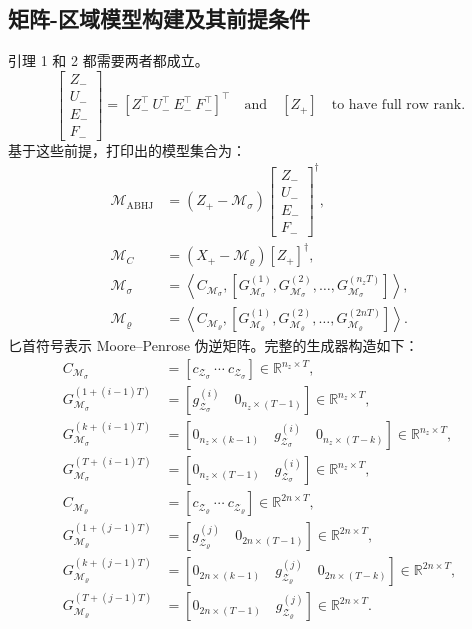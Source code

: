 \documentclass{article}
\begin{document}
\subsection*{矩阵-区域模型构建及其前提条件}
引理 1 和 2 都需要两者都成立。
\[
\begin{bmatrix}Z_-\\U_-\\E_-\\F_-\end{bmatrix}
=\left[Z_-^\top\ U_-^\top\ E_-^\top\ F_-^\top\right]^\top
\quad\text{and}\quad [Z_+]
\quad\text{to have full row rank}.
\]
基于这些前提，打印出的模型集合为：
\begin{align}
\mathcal{M}_{\mathrm{ABHJ}}&=(Z_+-\mathcal{M}_{\sigma})\begin{bmatrix}Z_-\\U_-\\E_-\\F_-\end{bmatrix}^{\dagger}, \tag{39}\\
\mathcal{M}_C&=(X_+-\mathcal{M}_{\varrho})[Z_+]^{\dagger}, \tag{40}\\
\mathcal{M}_{\sigma}&=\left\langle C_{\mathcal{M}_{\sigma}},[G_{\mathcal{M}_{\sigma}}^{(1)},G_{\mathcal{M}_{\sigma}}^{(2)},\ldots,G_{\mathcal{M}_{\sigma}}^{(n_zT)}]\right\rangle, \tag{41}\\
\mathcal{M}_{\varrho}&=\left\langle C_{\mathcal{M}_{\varrho}},[G_{\mathcal{M}_{\varrho}}^{(1)},G_{\mathcal{M}_{\varrho}}^{(2)},\ldots,G_{\mathcal{M}_{\varrho}}^{(2nT)}]\right\rangle. \tag{42}
\end{align}
匕首符号表示 Moore–Penrose 伪逆矩阵。完整的生成器构造如下：
\begin{align}
C_{\mathcal{M}_{\sigma}}&=[c_{\mathcal{Z}_{\sigma}}\ \cdots\ c_{\mathcal{Z}_{\sigma}}]\in\mathbb{R}^{n_z\times T}, \tag{43a}\\
G_{\mathcal{M}_{\sigma}}^{(1+(i-1)T)}&=[g_{\mathcal{Z}_{\sigma}}^{(i)}\quad 0_{n_z\times(T-1)}]\in\mathbb{R}^{n_z\times T}, \tag{43b}\\
G_{\mathcal{M}_{\sigma}}^{(k+(i-1)T)}&=[0_{n_z\times(k-1)}\quad g_{\mathcal{Z}_{\sigma}}^{(i)}\quad0_{n_z\times(T-k)}]\in\mathbb{R}^{n_z\times T}, \tag{43c}\\
G_{\mathcal{M}_{\sigma}}^{(T+(i-1)T)}&=[0_{n_z\times(T-1)}\quad g_{\mathcal{Z}_{\sigma}}^{(i)}]\in\mathbb{R}^{n_z\times T}, \tag{43d}\\
C_{\mathcal{M}_{\varrho}}&=[c_{\mathcal{Z}_{\varrho}}\ \cdots\ c_{\mathcal{Z}_{\varrho}}]\in\mathbb{R}^{2n\times T}, \tag{44a}\\
G_{\mathcal{M}_{\varrho}}^{(1+(j-1)T)}&=[g_{\mathcal{Z}_{\varrho}}^{(j)}\quad0_{2n\times(T-1)}]\in\mathbb{R}^{2n\times T}, \tag{44b}\\
G_{\mathcal{M}_{\varrho}}^{(k+(j-1)T)}&=[0_{2n\times(k-1)}\quad g_{\mathcal{Z}_{\varrho}}^{(j)}\quad0_{2n\times(T-k)}]\in\mathbb{R}^{2n\times T}, \tag{44c}\\
G_{\mathcal{M}_{\varrho}}^{(T+(j-1)T)}&=[0_{2n\times(T-1)}\quad g_{\mathcal{Z}_{\varrho}}^{(j)}]\in\mathbb{R}^{2n\times T}. \tag{44d}
\end{align}
\end{document}
